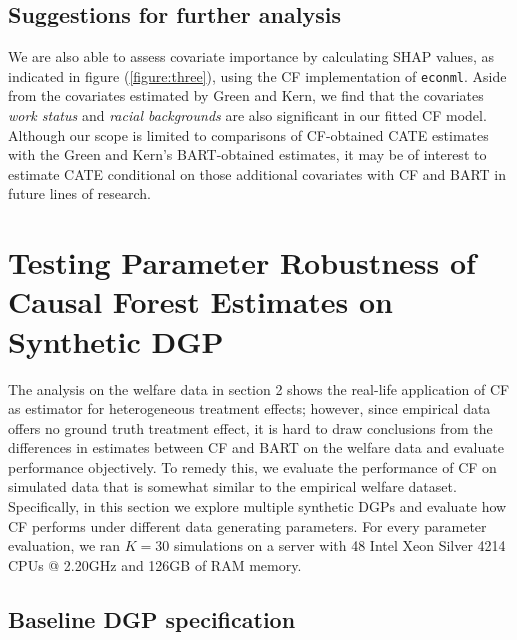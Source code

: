 \documentclass[12pt]{article}
\begin{document}
\subsection{Suggestions for further analysis}
We are also able to assess covariate importance by calculating SHAP values, as
indicated in figure (\ref{figure:three}), using the CF implementation of \texttt{econml}. Aside
from the covariates estimated by Green and Kern, we find that the covariates
\textit{work status} and \textit{racial backgrounds} are also significant in our
fitted CF model. Although our scope is limited to comparisons of CF-obtained
CATE estimates with the Green and Kern's BART-obtained estimates, it may be of
interest to estimate CATE conditional on those additional covariates with CF and
BART in future lines of research. 





\section{Testing Parameter Robustness of Causal Forest Estimates on Synthetic DGP} 

The analysis on the welfare data in section 2 shows the real-life application of
CF as estimator for heterogeneous treatment effects; however, since empirical
data offers no ground truth treatment effect, it is hard to draw conclusions
from the differences in estimates between CF and BART on the welfare data and
evaluate performance objectively. To remedy this, we evaluate the performance of
CF on simulated data that is somewhat similar to the empirical welfare dataset.
Specifically, in this section we explore multiple synthetic DGPs and evaluate
how CF performs under different data generating parameters. For every parameter
evaluation, we ran $K=30$ simulations on a server with 48 Intel Xeon Silver 4214
CPUs @ 2.20GHz and 126GB of RAM memory.

\subsection{Baseline DGP specification} 
\end{document}
